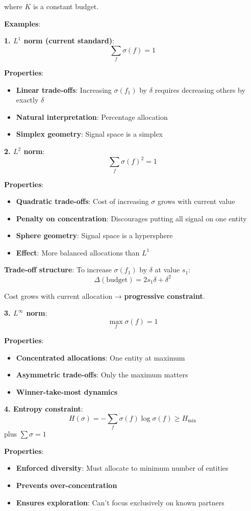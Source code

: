 \documentclass[11pt,a4paper]{article}
\theoremstyle{definition}
\theoremstyle{remark}
\begin{document}
where $K$ is a constant budget.

\textbf{Examples}:

\textbf{1. $L^1$ norm (current standard)}:
\[ \sum_f \sigma(f) = 1 \]

\textbf{Properties}:
\begin{itemize}
\item \textbf{Linear trade-offs}: Increasing $\sigma(f_1)$ by $\delta$ requires decreasing others by exactly $\delta$
\item \textbf{Natural interpretation}: Percentage allocation
\item \textbf{Simplex geometry}: Signal space is a simplex
\end{itemize}

\textbf{2. $L^2$ norm}:
\[ \sum_f \sigma(f)^2 = 1 \]

\textbf{Properties}:
\begin{itemize}
\item \textbf{Quadratic trade-offs}: Cost of increasing $\sigma$ grows with current value
\item \textbf{Penalty on concentration}: Discourages putting all signal on one entity
\item \textbf{Sphere geometry}: Signal space is a hypersphere
\item \textbf{Effect}: More balanced allocations than $L^1$
\end{itemize}

\textbf{Trade-off structure}: To increase $\sigma(f_1)$ by $\delta$ at value $s_1$:
\[ \Delta(\text{budget}) = 2s_1 \delta + \delta^2 \]

Cost grows with current allocation → \textbf{progressive constraint}.

\textbf{3. $L^\infty$ norm}:
\[ \max_f \sigma(f) = 1 \]

\textbf{Properties}:
\begin{itemize}
\item \textbf{Concentrated allocations}: One entity at maximum
\item \textbf{Asymmetric trade-offs}: Only the maximum matters
\item \textbf{Winner-take-most dynamics}
\end{itemize}

\textbf{4. Entropy constraint}:
\[ H(\sigma) = -\sum_f \sigma(f) \log \sigma(f) \ge H_{\min} \]
plus $\sum \sigma = 1$

\textbf{Properties}:
\begin{itemize}
\item \textbf{Enforced diversity}: Must allocate to minimum number of entities
\item \textbf{Prevents over-concentration}
\item \textbf{Ensures exploration}: Can't focus exclusively on known partners
\end{itemize}
\end{document}
